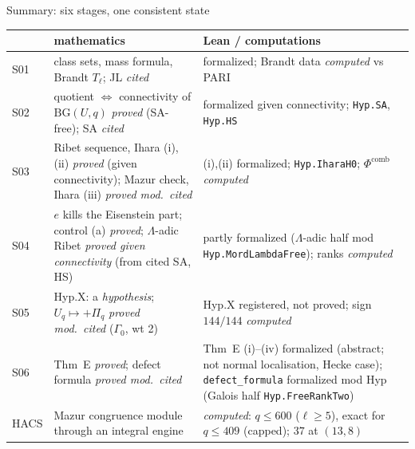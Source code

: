 \begin{frame}[shrink=5]{Summary: six stages, one consistent state}
  \scriptsize
  \setlength{\tabcolsep}{3pt}\renewcommand{\arraystretch}{0.9}
  \begin{tabular}{@{}l >{\raggedright\arraybackslash}p{6.3cm} >{\raggedright\arraybackslash}p{6.2cm}@{}}\toprule
    & mathematics & Lean / computations\\\midrule
    S01 & class sets, mass formula, Brandt $T_\ell$; JL \emph{cited} & formalized; Brandt data \emph{computed} vs PARI\\
    S02 & quotient $\Leftrightarrow$ connectivity of $\mathrm{BG}(U,q)$ \emph{proved} (SA-free); SA \emph{cited} & formalized given connectivity; \texttt{Hyp.SA}, \texttt{Hyp.HS}\\
    S03 & Ribet sequence, Ihara (i),(ii) \emph{proved} (given connectivity); Mazur check, Ihara (iii) \emph{proved mod.\ cited} & (i),(ii) formalized; \texttt{Hyp.IharaH0}; $\Phi^{\mathrm{comb}}$ \emph{computed}\\
    S04 & $e$ kills the Eisenstein part; control (a) \emph{proved}; $\Lambda$-adic Ribet \emph{proved given connectivity} (from cited SA, HS) & partly formalized ($\Lambda$-adic half mod \texttt{Hyp.MordLambdaFree}); ranks \emph{computed}\\
    S05 & Hyp.X: a \emph{hypothesis}; $U_q\mapsto+\Pi_q$ \emph{proved mod.\ cited} ($\Gamma_0$, wt 2) & Hyp.X registered, not proved; sign $144/144$ \emph{computed}\\
    S06 & Thm~E \emph{proved}; defect formula \emph{proved mod.\ cited} & Thm~E (i)--(iv) formalized (abstract; not normal localisation, Hecke case); \texttt{defect\_formula} formalized mod Hyp (Galois half \texttt{Hyp.FreeRankTwo})\\
    HACS & Mazur congruence module through an integral engine & \emph{computed}: $q\le 600$ ($\ell\ge5$), exact for $q\le 409$ (capped); $37$ at $(13,8)$\\\bottomrule
  \end{tabular}


\end{frame}
